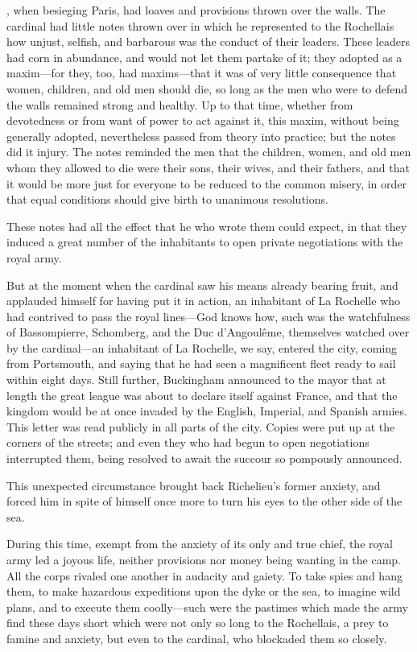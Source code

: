 , when besieging Paris, had loaves and provisions thrown over the walls. The cardinal had little notes thrown over in which he represented to the Rochellais how unjust, selfish, and barbarous was the conduct of their leaders. These leaders had corn in abundance, and would not let them partake of it; they adopted as a maxim—for they, too, had maxims—that it was of very little consequence that women, children, and old men should die, so long as the men who were to defend the walls remained strong and healthy. Up to that time, whether from devotedness or from want of power to act against it, this maxim, without being generally adopted, nevertheless passed from theory into practice; but the notes did it injury. The notes reminded the men that the children, women, and old men whom they allowed to die were their sons, their wives, and their fathers, and that it would be more just for everyone to be reduced to the common misery, in order that equal conditions should give birth to unanimous resolutions. 

These notes had all the effect that he who wrote them could expect, in that they induced a great number of the inhabitants to open private negotiations with the royal army. 

But at the moment when the cardinal saw his means already bearing fruit, and applauded himself for having put it in action, an inhabitant of La Rochelle who had contrived to pass the royal lines—God knows how, such was the watchfulness of Bassompierre, Schomberg, and the Duc d'Angoulême, themselves watched over by the cardinal—an inhabitant of La Rochelle, we say, entered the city, coming from Portsmouth, and saying that he had seen a magnificent fleet ready to sail within eight days. Still further, Buckingham announced to the mayor that at length the great league was about to declare itself against France, and that the kingdom would be at once invaded by the English, Imperial, and Spanish armies. This letter was read publicly in all parts of the city. Copies were put up at the corners of the streets; and even they who had begun to open negotiations interrupted them, being resolved to await the succour so pompously announced. 

This unexpected circumstance brought back Richelieu's former anxiety, and forced him in spite of himself once more to turn his eyes to the other side of the sea. 

During this time, exempt from the anxiety of its only and true chief, the royal army led a joyous life, neither provisions nor money being wanting in the camp. All the corps rivaled one another in audacity and gaiety. To take spies and hang them, to make hazardous expeditions upon the dyke or the sea, to imagine wild plans, and to execute them coolly—such were the pastimes which made the army find these days short which were not only so long to the Rochellais, a prey to famine and anxiety, but even to the cardinal, who blockaded them so closely. 

